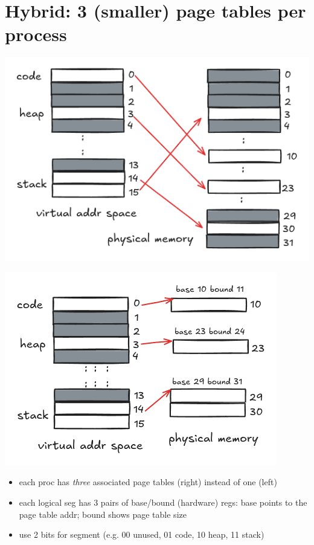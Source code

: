 \section*{Hybrid: 3 (smaller) page tables per process}
\begin{minipage}{0.5\linewidth}
  \includegraphics[width=\linewidth]{imgs/bigger_sparse_page}
\end{minipage}
\begin{minipage}{0.5\linewidth}
  \includegraphics[width=\linewidth]{imgs/hybrid_page_table}
\end{minipage}
\begin{itemize}
\item each proc has \emph{three} associated page tables (right) instead of one (left)
\item each logical seg has 3 pairs of base/bound (hardware) regs: base points to the page table addr; bound shows page table size
\item use 2 bits for segment (e.g. 00 unused, 01 code, 10 heap, 11 stack)
\end{itemize}
